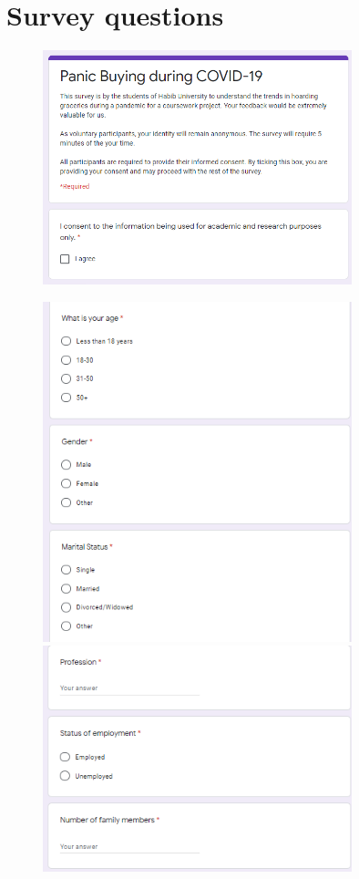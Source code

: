 \documentclass[runningheads]{llncs}
\begin{document}
\section{Survey questions}
\begin{figure}[H]
  \includegraphics[width=0.8\textwidth]{survey-pg1.PNG}
\end{figure}
\begin{figure}
  \includegraphics[width=0.8\textwidth]{survey-pg2.PNG}
  \includegraphics[width=0.8\textwidth]{survey-pg3.PNG}
\end{figure}
\end{document}
